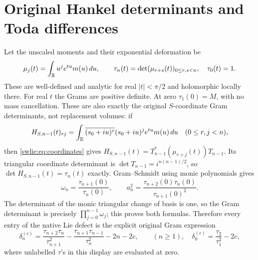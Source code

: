 \documentclass[11pt]{article}
\begin{document}
\section{Original Hankel determinants and Toda differences}

Let the unscaled moments and their exponential deformation be
\begin{equation}\label{swlie:eq:tau}
 \mu_j(t)=\int_\mathbb R u^je^{tu}m(u)\,du,\qquad
 \tau_n(t)=\det(\mu_{r+s}(t))_{0\leq r,s<n},\quad \tau_0(t)=1 .
\end{equation}
These are well-defined and analytic for real $|t|<\pi/2$
and holomorphic locally there. For real $t$ the Grams are
positive definite. At zero $\tau_1(0)=M$, with no mass
cancellation. These are also exactly the original
$S$-coordinate Gram determinants, not replacement volumes:
if
\[
 H_{S,n-1}(t)_{rj}
 =\int_\mathbb R\overline{(s_0+iu)^r}(s_0+iu)^j e^{tu}m(u)\,du
 \quad(0\leq r,j<n),
\]
then \eqref{swlie:eq:coordinates} gives
$H_{S,n-1}(t)=T_{n-1}^*(\mu_{r+j}(t))T_{n-1}$.
Its triangular coordinate determinant is
$\det T_{n-1}=i^{n(n-1)/2}$, so
$\det H_{S,n-1}(t)=\tau_n(t)$ exactly.
Gram--Schmidt using monic polynomials gives
\begin{equation}\label{swlie:eq:hankelratios}
 \omega_n=\frac{\tau_{n+1}(0)}{\tau_n(0)},\qquad
 a_n^2=\frac{\tau_{n+2}(0)\tau_n(0)}{\tau_{n+1}(0)^2}.
\end{equation}
The determinant of the monic triangular change of basis is
one, so the Gram determinant is precisely
$\prod_{j=0}^{n-1}\omega_j$; this proves both formulas.
Therefore every entry of the native Lie defect is the
explicit original Gram expression
\begin{equation}\label{swlie:eq:hankeldefect}
 \delta_n^{(c)}
  =\frac{\tau_{n+2}\tau_n}{\tau_{n+1}^2}
    -\frac{\tau_{n+1}\tau_{n-1}}{\tau_n^2}-2n-2c,
 \qquad (n\geq1),
 \quad \delta_0^{(c)}=\frac{\tau_2}{\tau_1^2}-2c,
\end{equation}
where unlabelled $\tau$'s in this display are evaluated at zero.
\end{document}

